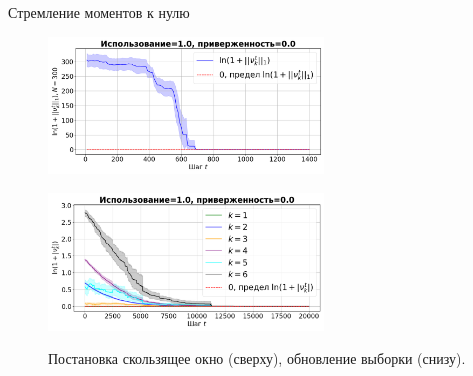 \documentclass{beamer}
\begin{document}
    \begin{frame}{Стремление моментов к нулю}
        \begin{figure}
            \centering
            \includegraphics[width=0.65\textwidth]{fig/k_mom_sw_synthetic_sgd_model_50_1.0_0.0.png}~

            \includegraphics[width=0.65\textwidth]{fig/k_mom_su_synthetic_sgd_model_50_1.0_0.0.png}

            Постановка скользящее окно (сверху), обновление выборки (снизу).
        \end{figure}
    \end{frame}
\end{document}

